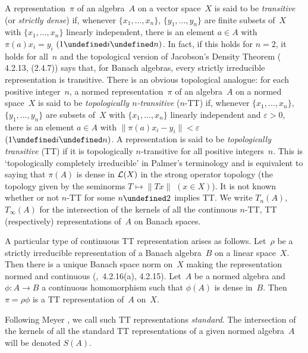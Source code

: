 \documentclass[11pt]{article}
\let\leq\undefined  \let\geq\undefined
\let\le\leq   \let\ge\geq
\newcommand{\e}{\varepsilon}
\newcommand{\detail}[1]{}
\newcommand{\LX}{{\cal L}(X)}
\begin{document}
A representation~$\pi$ of an algebra~$A$ on a vector space~$X$ is said to be
{\em transitive} (or {\em strictly dense}) if, whenever $\{x_1,\dots,x_n\}$,
$\{y_1,\dots,y_n\}$ are finite subsets of~$X$ with $\{x_1,\dots,x_n\}$ linearly
independent, there is an element $a \in A$ with $\pi(a)x_i = y_i$ $(1 \le i \le
n)$.  In fact, if this holds for $n=2$, it holds for all~$n$ and the topological
version of Jacobson's Density Theorem (\cite{Palmerbk} 4.2.13, \cite{Rickart}
(2.4.7)) says that, for Banach algebras, every strictly irreducible representation is
transitive.  There is an obvious topological analogue:  for each positive
integer~$n$, a normed representation~$\pi$ of an algebra~$A$ on a normed
space~$X$ is said to be {\em topologically $n$-transitive} ($n$-TT) if, whenever
$\{x_1,\dots,x_n\}$, $\{y_1,\dots,y_n\}$ are subsets of~$X$ with
$\{x_1,\dots,x_n\}$ linearly independent and $\e > 0$, there is an element $a
\in A$ with $\|\pi(a)x_i - y_i\| < \e$ $(1 \le i \le n)$.   A representation is
said to be {\em topologically transitive} (TT)  if it is topologically
$n$-transitive for all positive integers~$n$.   This is `topologically
completely irreducible' in Palmer's terminology and is equivalent to saying that
$\pi(A)$ is dense in $\LX$ in the strong operator topology (the topology given
by the seminorms $T \mapsto \|Tx\|$ $(x \in X)$).    It is not known whether or
not $n$-TT for some $n \ge 2$ implies TT.  We write $T_n(A)$, $T_\infty(A)$ for the
intersection of the kernels of all the continuous $n$-TT, TT (respectively)
representations of~$A$ on Banach spaces.


A particular type of continuous TT representation arises as follows.
Let~$\rho$ be a strictly irreducible representation of a Banach algebra~$B$ on a linear
space~$X$.   Then there is a unique Banach space norm on~$X$ making the
representation normed and continuous (\cite{Palmerbk},~4.2.16(a), 4.2.15).
Let~$A$ be a normed algebra and $\phi:A \to B$ a continuous homomorphism such
that $\phi(A)$ is dense in~$B$.  Then $\pi = \rho\phi$ is a TT representation
of~$A$ on~$X$.
\detail{For if $x_1,\dots,x_n,$ $y_1,\dots,y_n$ are in~$X$ with
$\{x_1,\dots,x_n\}$ linearly independent, then there exists $b \in B$ such that
$\rho(b)(x_i) = y_i$ $(1 \le i \le n)$.   Given $\e > 0$, we find $a \in A$ such
that $\|\phi(a) - b\| < \e/\max_i\|x_i\|$ and then $\|\pi(a)(x_i) - y_i\| < \e$.}
Following Meyer \cite{Meyer1}, we call such TT representations {\em standard}.
The intersection of the kernels of all the standard TT representations of a
given normed algebra~$A$ will be denoted $S(A)$.
\end{document}
